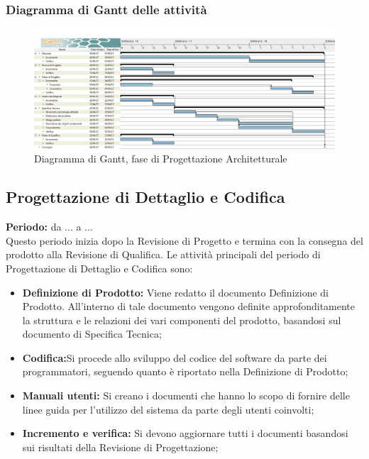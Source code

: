 	\subsubsection{Diagramma di Gantt delle attività}
	\begin{figure}[H]
		\centering
		\includegraphics[width=1\linewidth]{immagini/gantt/progettazione_architetturale.png}
		\caption{Diagramma di Gantt, fase di Progettazione Architetturale}
	\end{figure}
	\subsection{Progettazione di Dettaglio e Codifica}
	\textbf{Periodo:} da ... a ... \\
	Questo periodo inizia dopo la Revisione di Progetto e termina con la consegna del prodotto alla Revisione di Qualifica. Le attività principali del periodo di Progettazione di Dettaglio e Codifica sono: \\
	\begin{itemize}
		\item \textbf{Definizione di Prodotto:} Viene redatto il documento Definizione di Prodotto. All'interno di tale documento vengono definite approfonditamente la struttura e le relazioni dei vari componenti del prodotto, basandosi sul documento di Specifica Tecnica; \\
		\item \textbf{Codifica:}Si procede allo sviluppo del codice del software da parte dei programmatori, seguendo quanto è riportato nella Definizione di Prodotto; \\
		\item \textbf{Manuali utenti:} Si creano i documenti che hanno lo scopo di fornire delle linee guida per l'utilizzo del sistema da parte degli utenti coinvolti; \\
		\item \textbf{Incremento e verifica:} Si devono aggiornare tutti i documenti basandosi sui risultati della Revisione di Progettazione; \\
	\end{itemize}
